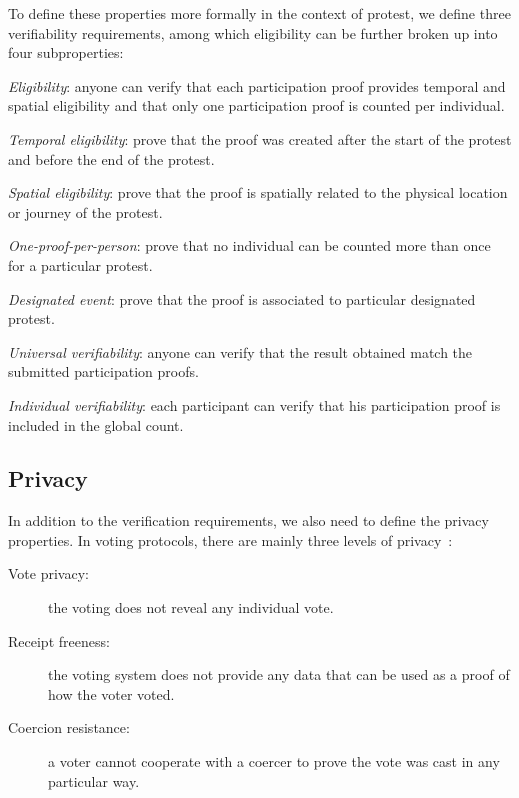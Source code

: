 To define these properties more formally in the context of protest, we define three verifiability requirements, among which eligibility can be further broken up into four subproperties:
\begin{requirements}[V]
  \item\label{EligibilityVerif} \emph{Eligibility}: anyone can verify that each participation proof provides temporal and spatial eligibility and that only one participation proof is counted per individual.
    \begin{requirements}
    \item\label{TemporallyRelated} \emph{Temporal eligibility}: prove that the proof was created after the start of the protest and before the end of the protest.
    \item\label{SpatiallyRelated} \emph{Spatial eligibility}: prove that the proof is spatially related to the physical location or journey of the protest.
    \item\label{CountOnce} \emph{One-proof-per-person}: prove that no individual can be counted more than once for a particular protest.
    \item\label{DesignatedEvent} \emph{Designated event}: prove that the proof is associated to particular designated protest.
    \end{requirements}

  \item\label{UniversalVerif} \emph{Universal verifiability}: anyone can verify that the result obtained match the submitted participation proofs.

  \item\label{IndividualVerif} \emph{Individual verifiability}: each participant can verify that his participation proof is included in the global count.
\end{requirements}

\subsection{Privacy}%
\label{Privacy}

In addition to the verification requirements, we also need to define the privacy properties.
In voting protocols, there are mainly three levels of privacy~\cite{VerifyingPrivacyPropertiesOfVotingProtocols}:
\begin{description}
\item[Vote privacy:] the voting does not reveal any individual vote.
\item[Receipt freeness:] the voting system does not provide any data that can be used as a proof of how the voter voted.
\item[Coercion resistance:] a voter cannot cooperate with a coercer to prove the vote was cast in any particular way.
\end{description}

